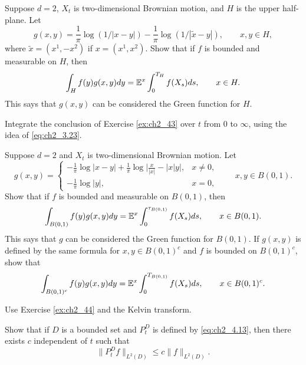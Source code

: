 
\begin{exercise}\label{ex:ch2_44}
Suppose $d = 2$, $X_t$ is two-dimensional Brownian motion, and $H$ is the upper half-plane. Let
\mpagebreak
\[
    g(x,y) = \frac{1}{\pi}\log(1/|x - y|) - \frac{1}{\pi}\log(1/|\widetilde{x} - y|), \qquad x,y \in H,
\]
where $\widetilde{x} = (x^1,-x^2)$ if $x = (x^1,x^2)$. Show that if $f$ is bounded and measurable on $H$, then
\[
    \int_H f(y)g(x,y)dy = \mathbb{E}^x\int_0^{T_H} f(X_s)ds, \qquad x \in H.
\]
This says that $g(x,y)$ can be considered the Green function for $H$.

\hint Integrate the conclusion of Exercise \ref{ex:ch2_43} over $t$ from $0$ to $\infty$, using the idea of \eqref{eq:ch2_3.23}.
\end{exercise}

\begin{exercise}\label{ex:ch2_45}
Suppose $d = 2$ and $X_t$ is two-dimensional Brownian motion. Let
\[
    g(x,y) = \begin{cases}
        -\frac{1}{\pi}\log|x - y| + \frac{1}{\pi}\log\Big|\frac{x}{|x|} - |x|y\Big|, & x \neq 0, \\
        -\frac{1}{\pi}\log|y|, & x = 0,
    \end{cases}
    \qquad x,y \in B(0,1).
\]
Show that if $f$ is bounded and measurable on $B(0,1)$, then
\[
    \int_{B(0,1)} f(y)g(x,y)dy = \mathbb{E}^x\int_0^{\tau_{B(0,1)}} f(X_s)ds, \qquad x \in B(0,1).
\]
This says that $g$ can be considered the Green function for $B(0,1)$. If $g(x,y)$ is defined by the same formula for $x,y \in B(0,1)^c$ and $f$ is bounded on $B(0,1)^c$, show that
\[
    \int_{B(0,1)^c} f(y)g(x,y)dy = \mathbb{E}^x\int_0^{T_{B(0,1)}} f(X_s)ds, \qquad x \in B(0,1)^c.
\]

\hint Use Exercise \ref{ex:ch2_44} and the Kelvin transform.
\end{exercise}


\begin{exercise}\label{ex:ch2_46}
Show that if $D$ is a bounded set and $P_t^D$ is defined by \eqref{eq:ch2_4.13}, then there exists $c$ independent of $t$ such that
\[
    \|P_t^D f\|_{L^2(D)} \leq c\|f\|_{L^2(D)}.
\]
\end{exercise}

\notessection
{}

